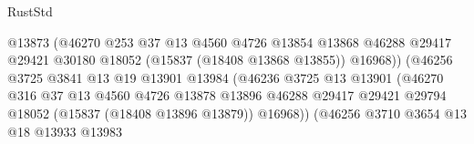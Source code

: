 \begin{lexlean}{RustStd}
\begin{coremodule}
                                            @13873
                                            (@46270
                                              @253
                                              @37
                                              @13
                                              @4560
                                              @4726
                                              @13854
                                              @13868
                                              @46288
                                              @29417
                                              @29421
                                              @30180
                                              @18052
                                              (@15837 (@18408 @13868 @13855))
                                              @16968))
                                          (@46256
                                            @3725
                                            @3841
                                            @13
                                            @19
                                            @13901
                                            @13984
                                            (@46236
                                              @3725
                                              @13
                                              @13901
                                              (@46270
                                                @316
                                                @37
                                                @13
                                                @4560
                                                @4726
                                                @13878
                                                @13896
                                                @46288
                                                @29417
                                                @29421
                                                @29794
                                                @18052
                                                (@15837 (@18408 @13896 @13879))
                                                @16968))
                                            (@46256
                                              @3710
                                              @3654
                                              @13
                                              @18
                                              @13933
                                              @13983

\end{coremodule}
\end{lexlean}
